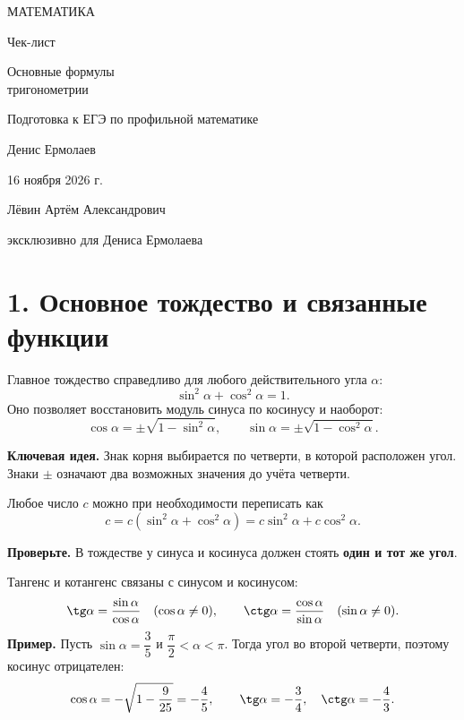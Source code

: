 \documentclass[a4paper,12pt]{article}
\newcommand{\keyidea}[1]{\par\smallskip\noindent\textcolor{darkaccent}{\textbf{Ключевая идея.}} #1\par\smallskip}
\newcommand{\alertline}[1]{\par\smallskip\noindent\textcolor{darkaccent}{\textbf{Проверьте.}} #1\par\smallskip}
\newcommand{\sectionheading}[1]{\section*{\textcolor{darkaccent}{#1}}}
\begin{document}
\begin{titlepage}
\thispagestyle{empty}
\begin{center}
\vspace*{24mm}
{\large\textcolor{darkaccent}{МАТЕМАТИКА}}\par
\vspace{24mm}
{\Huge\mdseries Чек-лист}\par
\vspace{13mm}
{\LARGE\textcolor{accent}{Основные формулы\\[2mm] тригонометрии}}\par
\vspace{13mm}
{\normalsize Подготовка к ЕГЭ по профильной математике}\par
\vspace{36mm}
{\large Денис Ермолаев}\par
\vspace{13mm}
{\large 16 ноября 2026 г.}\par
\vfill
{\small Лёвин Артём Александрович}\par
{\small эксклюзивно для Дениса Ермолаева}\par
\vspace{21mm}
\end{center}
\end{titlepage}

\sectionheading{1. Основное тождество и связанные функции}
Главное тождество справедливо для любого действительного угла $\alpha$:
\[
\boxed{\sin^2\alpha+\cos^2\alpha=1.}
\]
Оно позволяет восстановить модуль синуса по косинусу и наоборот:
\[
\cos\alpha=\pm\sqrt{1-\sin^2\alpha},\qquad
\sin\alpha=\pm\sqrt{1-\cos^2\alpha}.
\]
\keyidea{Знак корня выбирается по четверти, в которой расположен угол. Знаки \(\pm\) означают два возможных значения до учёта четверти.}
Любое число $c$ можно при необходимости переписать как
\[
 c=c(\sin^2\alpha+\cos^2\alpha)=c\sin^2\alpha+c\cos^2\alpha.
\]
\alertline{В тождестве у синуса и косинуса должен стоять \textbf{один и тот же угол}.}
Тангенс и котангенс связаны с синусом и косинусом:
\[
\tg\alpha=\frac{\sin\alpha}{\cos\alpha}\quad(\cos\alpha\ne0),
\qquad
\ctg\alpha=\frac{\cos\alpha}{\sin\alpha}\quad(\sin\alpha\ne0).
\]
\textbf{Пример.} Пусть $\sin\alpha=\dfrac35$ и $\dfrac\pi2<\alpha<\pi$. Тогда угол во второй четверти,
поэтому косинус отрицателен:
\[
\cos\alpha=-\sqrt{1-\frac9{25}}=-\frac45,\qquad
\tg\alpha=-\frac34,\quad\ctg\alpha=-\frac43.
\]
\end{document}

